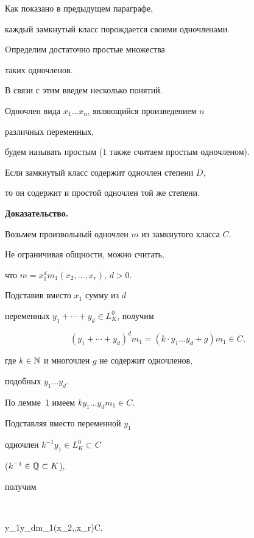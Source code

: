 Как показано в предыдущем параграфе, 


каждый замкнутый класс порождается своими одночленами.


Oпределим достаточно простые множества


таких одночленов.


В связи с этим введем несколько понятий.





Одночлен вида $x_1\dotsc x_n$, являющийся произведением $n$ 


различных переменных,


будем называть простым ($1$ также считаем простым одночленом).





\begin{lem}


Если замкнутый класс содержит одночлен степени $D$,


то он содержит и простой одночлен той же степени.


\end{lem}





{\bf Доказательство.}


Возьмем произвольный одночлен $m$ из замкнутого класса $C$.


Не ограничивая общности, можно считать,


что $m={x_1^d m_1(x_2,\dotsc,x_r)}$, $d>0$. 


Подставив вместо $x_1$ сумму из $d$ 


переменных $y_1+\dotsb +y_d\in L^0_K$, получим


$$
(y_1+\dotsb +y_d)^d m_1=({k \cdot y_1\dotsc y_d} +g)m_1\in C,


$$


где $k\in \Bbb N$ и многочлен $g$ не содержит одночленов,


подобных $y_1\dotsc y_d$.


По лемме~1 имеем ${k y_1\dotsc y_d}m_1\in C$.


Подставляя вместо переменной $y_1$ 


одночлен $k^{-1}y_1\in L^0_K\subset C$ 


($k^{-1}\in \Bbb Q\subset K$),


получим 


$$


{y_1\dotsc y_d}m_1(x_2,\dotsc,x_r)\in C.


